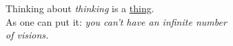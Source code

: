 \documentclass{article}
\begin{document}
Thinking about \emph{thinking} is a \underline{thing}.\\
As one can put it: \emph{you can't have an \emph{infinite} number \\
of visions.}
\end{document}
